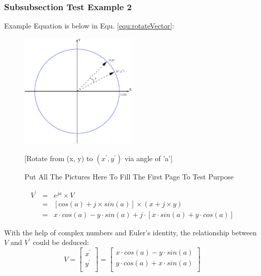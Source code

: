 \subsubsection{Subsubsection Test Example 2}
Example Equation is below in Equ. \eqref{equ:rotateVector}:
\begin{figure}[!htbp]
\begin{center}
\includegraphics[width=0.5\textwidth]{graphic/CartesianCoordinate.pdf}
\caption{Put All The Pictures Here To Fill The First Page To Test Purpose}
{\small [Rotate from (x, y) to $(x^{'},y^{'})$ via angle of 'a'] }
\label{fig:Cartesian}
\end{center}
\end{figure}


\begin{eqnarray}
V^{'} & = & e^{ja} \times V \\
      & = & [cos(a) + j \times sin(a)] \times (x+j \times y) \\
      & = & x \cdot cos(a)-y \cdot sin(a)+j \cdot [x \cdot sin(a) + y \cdot cos(a) ] 
\label{equ:rotateVector}
\end{eqnarray}

With the help of complex numbers and Euler's identity, the relationship between $V$ and $V^{'}$ could be deduced:
\begin{equation}
V=
\begin{bmatrix}
x^{'} 	\\
y^{'}	\\
\end{bmatrix}
= 
\begin{bmatrix}
	x \cdot cos(a) - y \cdot sin(a)	\\
	y \cdot cos(a) + x \cdot sin(a)	\\
\end{bmatrix}
\label{equ:vectorRotated}
\end{equation}

